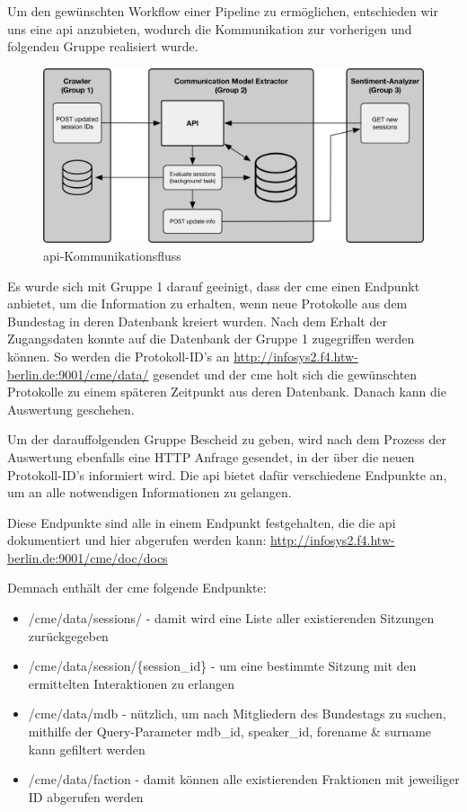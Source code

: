 Um den gewünschten Workflow einer Pipeline zu ermöglichen, entschieden wir
uns eine \gls{api} anzubieten, wodurch die Kommunikation zur vorherigen und
folgenden Gruppe realisiert wurde.

\begin{figure}[ht]
    \begin{center}
        \includegraphics[width=\textwidth]{images/03-cme/Communications.pdf}
    \end{center}
    \caption{\gls{api}-Kommunikationsfluss}
    \label{fig:03_api_call_flow}
\end{figure}

Es wurde sich mit Gruppe 1 darauf geeinigt, dass der \gls{cme} einen Endpunkt
anbietet, um die Information zu erhalten, wenn neue Protokolle aus dem
Bundestag in deren Datenbank kreiert wurden. Nach dem Erhalt der Zugangsdaten konnte
auf die Datenbank der Gruppe 1 zugegriffen werden können. So werden die
Protokoll-ID's an \url{http://infosys2.f4.htw-berlin.de:9001/cme/data/} gesendet
und der \gls{cme} holt sich die gewünschten Protokolle zu einem späteren Zeitpunkt
aus deren Datenbank. Danach kann die Auswertung geschehen.

Um der darauffolgenden Gruppe Bescheid zu geben, wird nach dem Prozess der
Auswertung ebenfalls eine HTTP Anfrage gesendet, in der über die neuen
Protokoll-ID's informiert wird. Die \gls{api} bietet dafür verschiedene Endpunkte
an, um an alle notwendigen Informationen zu gelangen.

Diese Endpunkte sind alle in einem Endpunkt festgehalten, die die \gls{api}
dokumentiert und hier abgerufen werden kann:
\url{http://infosys2.f4.htw-berlin.de:9001/cme/doc/docs}

Demnach enthält der \gls{cme} folgende Endpunkte:
\begin{itemize}
    \item /cme/data/sessions/ - damit wird eine Liste aller existierenden
    Sitzungen zurückgegeben
    \item /cme/data/session/\{session\_id\} - um eine bestimmte Sitzung mit den
    ermittelten Interaktionen zu erlangen
    \item /cme/data/mdb - nützlich, um nach Mitgliedern des Bundestags zu
    suchen, mithilfe der Query-Parameter mdb\_id, speaker\_id, forename
    \& surname kann gefiltert werden
    \item /cme/data/faction - damit können alle existierenden Fraktionen mit
    jeweiliger ID abgerufen werden
\end{itemize}

